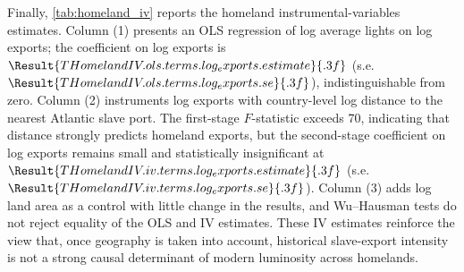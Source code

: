 \documentclass[12pt]{article}
\begin{document}
Finally, \autoref{tab:homeland_iv} reports the homeland instrumental-variables estimates. Column (1) presents an OLS regression of log average lights on log exports; the coefficient on log exports is $\Result{THomelandIV.ols.terms.log_exports.estimate}{.3f}$ (s.e.\ $\Result{THomelandIV.ols.terms.log_exports.se}{.3f}$), indistinguishable from zero. Column (2) instruments log exports with country-level log distance to the nearest Atlantic slave port. The first-stage $F$-statistic exceeds 70, indicating that distance strongly predicts homeland exports, but the second-stage coefficient on log exports remains small and statistically insignificant at $\Result{THomelandIV.iv.terms.log_exports.estimate}{.3f}$ (s.e.\ $\Result{THomelandIV.iv.terms.log_exports.se}{.3f}$). Column (3) adds log land area as a control with little change in the results, and Wu--Hausman tests do not reject equality of the OLS and IV estimates. These IV estimates reinforce the view that, once geography is taken into account, historical slave-export intensity is not a strong causal determinant of modern luminosity across homelands.
\end{document}
